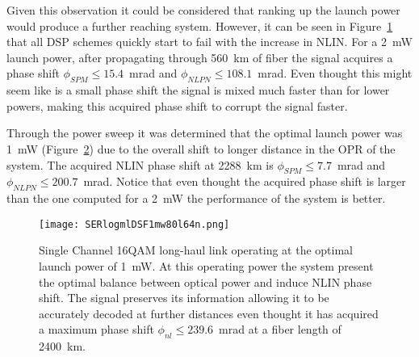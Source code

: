 \begin{figure}[h]
                                                                                                                                                                                                                                                                                                                                                                                                                                                                                                                                                                                                                                                                                                                                                                                                                                                                                                                                                                                            
 \label{fig:highP}
\end{figure}

Given this observation it could be considered that ranking up the launch power would produce a further reaching system. However, it can be seen in Figure~\ref{fig:highP} that all DSP schemes quickly start to fail with the increase in NLIN. For a 2~mW launch power, after propagating through 560~km of fiber the signal acquires a phase shift $\phi_{SPM}\le 15.4$~mrad and $\phi_{NLPN}\le 108.1$~mrad. Even thought this might seem like is a small phase shift the signal is mixed much faster than for lower powers, making this acquired phase shift to corrupt the signal faster.

Through the power sweep it was determined that the optimal launch power was 1~mW (Figure~\ref{fig:1mW}) due to the overall shift to longer distance in the OPR of the system. The acquired NLIN phase shift at 2288~km is $\phi_{SPM}\le 7.7$~mrad and $\phi_{NLPN}\le 200.7$~mrad. Notice that even thought the acquired phase shift is larger than the one computed for a 2~mW the performance of the system is better. 
  
  
  
  
\begin{figure}[h]
\centering
\texttt{[image: SERlogmlDSF1mw80l64n.png]}
\caption{Single Channel 16QAM long-haul link operating at the optimal launch power of 1~mW. At this operating power the system present the optimal balance between optical power and induce NLIN phase shift. The signal preserves its information allowing it to be accurately decoded at further distances even thought it has acquired a maximum phase shift $\phi_{nl}\le 239.6$~mrad at a fiber length of 2400~km. }
\label{fig:1mW}
\end{figure}



